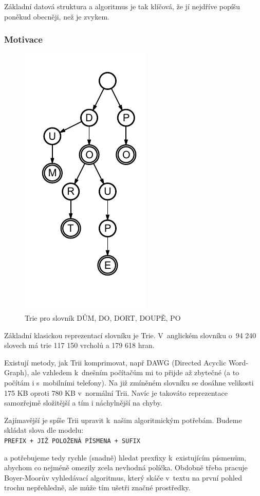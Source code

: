 \documentclass[a4paper]{article}
\begin{document}
Základní datová struktura a algoritmus je tak klíčová, že jí nejdříve popíšu poněkud obecněji, než je zvykem.

\subsubsection{Motivace}\begin{figure}[htb]
\centering
\includegraphics{pic/trie-all.pdf}
\caption{Trie pro slovník DŮM, DO, DORT, DOUPĚ, PO}
\label{trie}
\end{figure}
Základní klasickou reprezentací slovníku je Trie. V~anglickém slovníku o~94 240 slovech má trie 117 150 vrcholů a 179 618 hran. 

Existují metody, jak Trii komprimovat, např DAWG (Directed Acyclic Word-Graph), ale vzhledem k~dnešním počítačům mi to přijde až zbytečné (a to počítám i s~mobilními telefony). Na již zmíněném slovníku se dosáhne velikosti 175 KB oproti 780 KB v~normální Trii. Navíc je takováto reprezentace samozřejmě složitější a tím i náchylnější na chyby. 

Zajímavější je spíše Trii upravit k~našim algoritmickým potřebám. Budeme skládat slova dle modelu:\\
\texttt{PREFIX + JIŽ POLOŽENÁ PÍSMENA + SUFIX}

a potřebujeme tedy rychle (snadně) hledat prexfixy k~existujícím písmenům, abychom co nejméně omezily zcela nevhodná políčka. Obdobně třeba pracuje Boyer-Moorův vyhledávací algoritmus, který skáče v~textu na první pohled trochu nepřehledně, ale může tím ušetři značné prostředky.
\end{document}
